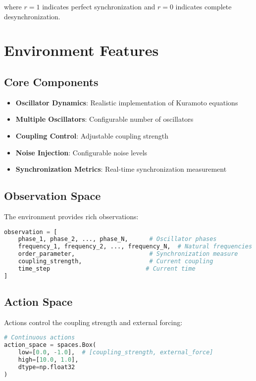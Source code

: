 where $r = 1$ indicates perfect synchronization and $r = 0$ indicates complete desynchronization.

\section{Environment Features}

\subsection{Core Components}

\begin{itemize}
    \item \textbf{Oscillator Dynamics}: Realistic implementation of Kuramoto equations
    \item \textbf{Multiple Oscillators}: Configurable number of oscillators
    \item \textbf{Coupling Control}: Adjustable coupling strength
    \item \textbf{Noise Injection}: Configurable noise levels
    \item \textbf{Synchronization Metrics}: Real-time synchronization measurement
\end{itemize}

\subsection{Observation Space}

The environment provides rich observations:

\begin{lstlisting}[language=python, caption=Observation Components]
observation = [
    phase_1, phase_2, ..., phase_N,      # Oscillator phases
    frequency_1, frequency_2, ..., frequency_N,  # Natural frequencies
    order_parameter,                     # Synchronization measure
    coupling_strength,                   # Current coupling
    time_step                           # Current time
]
\end{lstlisting}

\subsection{Action Space}

Actions control the coupling strength and external forcing:

\begin{lstlisting}[language=python, caption=Action Space]
# Continuous actions
action_space = spaces.Box(
    low=[0.0, -1.0],  # [coupling_strength, external_force]
    high=[10.0, 1.0],
    dtype=np.float32
)
\end{lstlisting}

